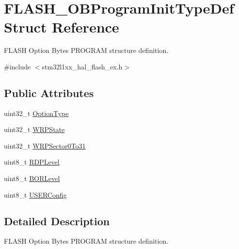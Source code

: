 \hypertarget{struct_f_l_a_s_h___o_b_program_init_type_def}{\section{F\-L\-A\-S\-H\-\_\-\-O\-B\-Program\-Init\-Type\-Def Struct Reference}
\label{struct_f_l_a_s_h___o_b_program_init_type_def}
}


F\-L\-A\-S\-H Option Bytes P\-R\-O\-G\-R\-A\-M structure definition.  




{\ttfamily \#include $<$stm32l1xx\-\_\-hal\-\_\-flash\-\_\-ex.\-h$>$}

\subsection*{Public Attributes}
\begin{DoxyCompactItemize}
\item 
uint32\-\_\-t \hyperlink{struct_f_l_a_s_h___o_b_program_init_type_def_a46bffc2a63ea02e15b9187856535d890}{Option\-Type}
\item 
uint32\-\_\-t \hyperlink{struct_f_l_a_s_h___o_b_program_init_type_def_a2607ba046f7a3af46e7209b8f1e9e20d}{W\-R\-P\-State}
\item 
uint32\-\_\-t \hyperlink{struct_f_l_a_s_h___o_b_program_init_type_def_a1ed8b83be8ebfcf9b42fff5577014642}{W\-R\-P\-Sector0\-To31}
\item 
uint8\-\_\-t \hyperlink{struct_f_l_a_s_h___o_b_program_init_type_def_a165bbb65be0086a30b13895594d274b1}{R\-D\-P\-Level}
\item 
uint8\-\_\-t \hyperlink{struct_f_l_a_s_h___o_b_program_init_type_def_a14c9f3c032ca3073d0c33f0c2bf4d5f9}{B\-O\-R\-Level}
\item 
uint8\-\_\-t \hyperlink{struct_f_l_a_s_h___o_b_program_init_type_def_ae6c9b55d49bc9627a2319ba680a924de}{U\-S\-E\-R\-Config}
\end{DoxyCompactItemize}


\subsection{Detailed Description}
F\-L\-A\-S\-H Option Bytes P\-R\-O\-G\-R\-A\-M structure definition. 

